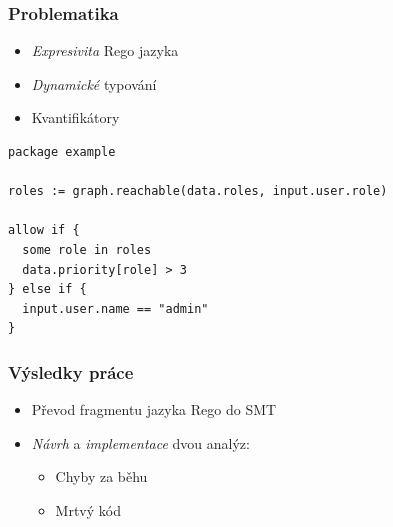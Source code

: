 \begin{frame}[fragile]
    \frametitle{Problematika}
    \begin{itemize}
      \item \emph{Expresivita} Rego jazyka
      \item \emph{Dynamické} typování
      \item Kvantifikátory
    \end{itemize}
    \vspace{.5cm}
\begin{lstlisting}[language=Rego]
package example

roles := graph.reachable(data.roles, input.user.role)

allow if {
  some role in roles
  data.priority[role] > 3
} else if {
  input.user.name == "admin"
}
\end{lstlisting}
\end{frame}



\begin{frame}
    \frametitle{Výsledky práce}
    \begin{itemize}
        \item Převod fragmentu jazyka Rego do SMT
        \item \emph{Návrh} a \emph{implementace} dvou analýz:
          \begin{itemize}
              \item Chyby za běhu
              \item Mrtvý kód
          \end{itemize}
    \end{itemize}
\end{frame}

